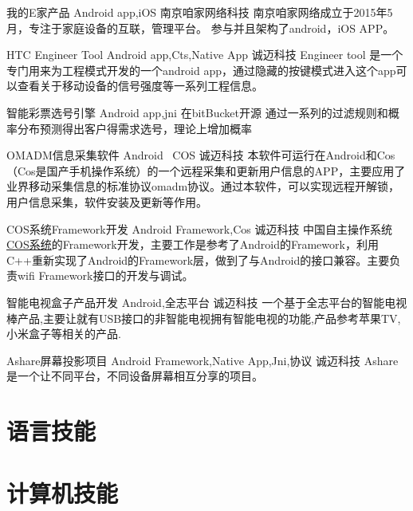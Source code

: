 \documentclass[11pt,a4paper]{moderncv}
\begin{document}
{我的E家产品}
{Android app,iOS}
{南京咱家网络科技}{}
{南京咱家网络成立于2015年5月，专注于家庭设备的互联，管理平台。
 参与并且架构了android，iOS APP。}


{HTC Engineer Tool}
{Android app,Cts,Native App}
{诚迈科技}{}
{Engineer tool 是一个专门用来为工程模式开发的一个android
 app，通过隐藏的按键模式进入这个app可以查看关于移动设备的信号强度等一系列工程信息。}

\cventry{}
{智能彩票选号引擎}
{Android app,jni}
{在bitBucket开源}{}
{通过一系列的过滤规则和概率分布预测得出客户得需求选号，理论上增加概率}

\cventry{}
{OMADM信息采集软件}
{Android \, COS}
{诚迈科技}{}
{本软件可运行在Android和Cos（Cos是国产手机操作系统）的一个远程采集和更新用户信息的APP，主要应用了业界移动采集信息的标准协议omadm协议。通过本软件，可以实现远程开解锁，用户信息采集，软件安装及更新等作用。}

\cventry{}
{COS系统Framework开发}
{Android Framework,Cos}
{诚迈科技}{}
{中国自主操作系统\href{http://www.china-cos.com/site/index.html}{COS系统}的Framework开发，主要工作是参考了Android的Framework，利用C++重新实现了Android的Framework层，做到了与Android的接口兼容。主要负责wifi
Framework接口的开发与调试。}

{智能电视盒子产品开发}
{Android,全志平台}
{诚迈科技}{}
{一个基于全志平台的智能电视棒产品,主要让就有USB接口的非智能电视拥有智能电视的功能,产品参考苹果TV,小米盒子等相关的产品. }

{Ashare屏幕投影项目}
{Android Framework,Native App,Jni,协议}
{诚迈科技}{}
{Ashare是一个让不同平台，不同设备屏幕相互分享的项目。      }


\section{语言技能}

\section{计算机技能}
\end{document}
